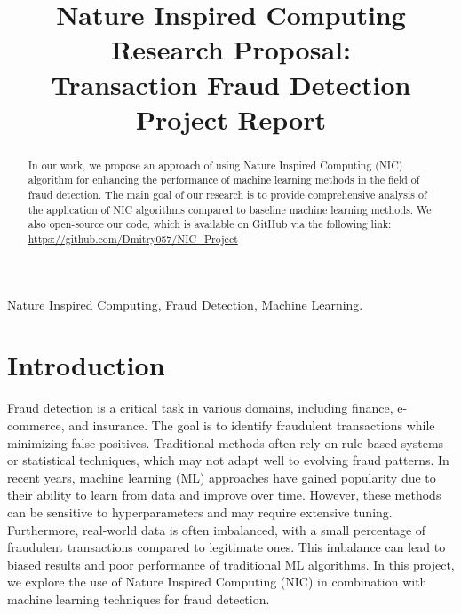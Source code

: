 \documentclass[conference]{IEEEtran}
\begin{document}
\title{Nature Inspired Computing Research Proposal:\\ Transaction Fraud Detection \\ Project Report}

\author{
	\and
	\and
	\and
}

\maketitle

\begin{abstract}
	In our work, we propose an approach of using Nature Inspired Computing
	(NIC) algorithm for enhancing the performance of machine learning
	methods in the field of fraud detection. The main goal of our
	research is to provide comprehensive analysis of the application
	of NIC algorithms compared to baseline machine learning methods.
	We also open-source our code, which is available on GitHub
	via the following link: \url{https://github.com/Dmitry057/NIC_Project}
\end{abstract}

\begin{IEEEkeywords}
	Nature Inspired Computing, Fraud Detection, Machine Learning.
\end{IEEEkeywords}

\section{Introduction}
Fraud detection is a critical task in various domains,
including finance, e-commerce, and insurance.
The goal is to identify fraudulent transactions while
minimizing false positives. Traditional methods often rely
on rule-based systems or statistical techniques,
which may not adapt well to evolving fraud patterns.
In recent years, machine learning (ML) approaches have
gained popularity due to their ability to learn from data
and improve over time. However, these methods can be sensitive
to hyperparameters and may require extensive tuning. Furthermore,
real-world data is often imbalanced, with a small percentage of
fraudulent transactions compared to legitimate ones.
This imbalance can lead to biased results and poor performance
of traditional ML algorithms.
In this project, we explore the use of Nature Inspired Computing (NIC)
in combination with machine learning techniques for fraud detection.
\end{document}
